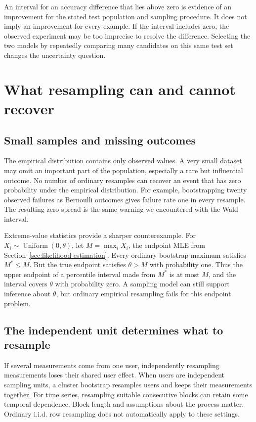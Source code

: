 An interval for an accuracy difference that lies above zero is evidence
of an improvement for the stated test population and sampling procedure.
It does not imply an improvement for every example. If the interval
includes zero, the observed experiment may be too imprecise to resolve
the difference. Selecting the two models by repeatedly comparing many
candidates on this same test set changes the uncertainty question.

\section{What resampling can and cannot recover}
\label{sec:bootstrap-limits}

\subsection{Small samples and missing outcomes}

The empirical distribution contains only observed values. A very small
dataset may omit an important part of the population, especially a
rare but influential outcome. No number of ordinary resamples can
recover an event that has zero probability under the empirical
distribution. For example, bootstrapping twenty observed failures
as Bernoulli outcomes gives failure rate one in every resample.
The resulting zero spread is the same warning we encountered with
the Wald interval.

Extreme-value statistics provide a sharper counterexample. For
\(X_i\sim\operatorname{Uniform}(0,\theta)\), let
\(M=\max_iX_i\), the endpoint MLE from
Section~\ref{sec:likelihood-estimation}. Every ordinary bootstrap
maximum satisfies \(M^*\le M\). But the true endpoint satisfies
\(\theta>M\) with probability one. Thus the upper endpoint of a
percentile interval made from \(M^*\) is at most \(M\), and the
interval covers \(\theta\) with probability zero. A sampling model
can still support inference about \(\theta\), but ordinary empirical
resampling fails for this endpoint problem.

\subsection{The independent unit determines what to resample}

If several measurements come from one user, independently resampling
measurements loses their shared user effect. When users are independent
sampling units, a cluster bootstrap resamples users and keeps their
measurements together. For time series, resampling suitable consecutive
blocks can retain some temporal dependence. Block length and assumptions
about the process matter. Ordinary i.i.d. row resampling does not
automatically apply to these settings.

